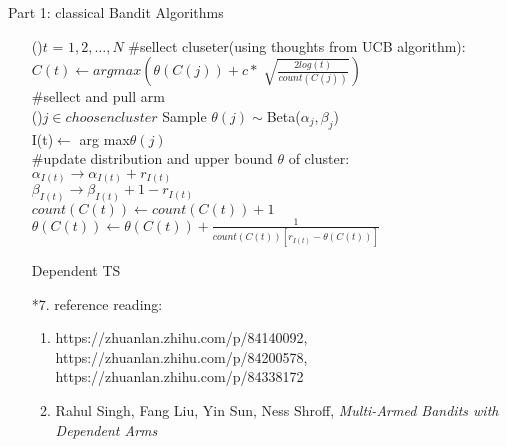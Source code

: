 \documentclass{article}
\begin{document}
\begin{homeworkProblem}{Part 1: classical Bandit Algorithms}
\begin{enumerate}
\begin{algorithm}[H]
            \For(){$t$ = $1,2,\dots , N$}{
                \#sellect cluseter(using thoughts from UCB algorithm):\\
                $C(t)\leftarrow arg max(\theta(C(j))+c*\sqrt[]{\frac{2log(t)}{count(C(j))}})$\\
                \#sellect and pull arm\\
                \For(){$j\in choosen cluster$}{
                    Sample $\theta(j)\sim$Beta($\alpha_j,\beta_j$)\\
                }
                I(t)$\leftarrow$ arg max$\theta(j)$\\
                \#update distribution and upper bound $\theta$ of cluster:\\
                $\alpha_{I(t)}\rightarrow \alpha_{I(t)} + r_{I(t)}$\\
                $\beta_{I(t)}\rightarrow \beta_{I(t)} + 1 - r_{I(t)}$\\
                $count(C(t))\leftarrow count(C(t)) + 1$\\
                $\theta(C(t))\leftarrow \theta(C(t)) + \frac{1}{count(C(t))[r_{I(t)}-\theta(C(t))]}$\\
            }
            \caption{Dependent TS}
          \end{algorithm}
        \item[*7.] reference reading:
        \begin{enumerate}[1]
            \item https://zhuanlan.zhihu.com/p/84140092, https://zhuanlan.zhihu.com/p/84200578, \\
            https://zhuanlan.zhihu.com/p/84338172
            \item Rahul Singh, Fang Liu, Yin Sun, Ness Shroff, \textsl{Multi-Armed Bandits with Dependent Arms}

        \end{enumerate}
    \end{enumerate}
\end{homeworkProblem}
\pagebreak
\end{document}
